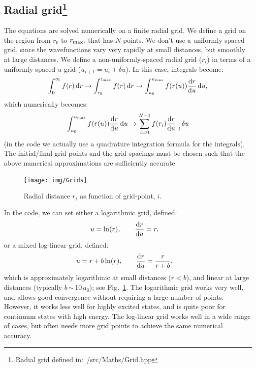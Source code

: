 \documentclass[10pt,twocolumn,a4paper]{article}%
\newcommand{\be}{\begin{equation}}
\newcommand{\ee}{\end{equation}}
\def\d{\ensuremath{{\rm d}}}
\begin{document}
\subsection[Radial grid]{Radial grid\label{sec:grid}\footnote{Radial grid defined in:~/src/Maths/Grid.hpp}}

The equations are solved numerically on a finite radial grid.
We define a grid on the region from $r_0$ to $r_{\rm max}$, that has $N$ points.
We don't use a uniformly spaced grid, since the wavefunctions vary very rapidly at small distances, but smoothly at large distances.
We define a non-uniformly-spaced radial grid ($r_i$) in terms of a uniformly spaced $u$ grid ($u_{i+1}=u_i+\delta u$).
In this case, integrals become:
\be
\int_{0}^{\infty} f(r)\,\d r \to 
\int_{r_0}^{\rm r_{max}} f(r)\,\d r \to 
\int_{u_0}^{u_{\rm max}} f(r(u))\frac{\d r}{\d u}\,\d u,
\ee
which numerically becomes:
\be
\int_{u_0}^{u_{\rm max}} f(r(u))\frac{\d r}{\d u}\,\d u \to
\sum_{i=0}^{N-1} f(r_i)\frac{\d r}{\d u}\Big|_i\,\delta u
\ee
(in the code we actually use a quadrature integration formula for the integrals).
The initial/final grid points and the grid spacings must be chosen such that the above numerical approximations are sufficiently accurate.

\begin{figure}
\centering
\texttt{[image: img/Grids]}
\caption{\small Radial distance $r_i$ as function of grid-point, $i$.\label{Fig:grids}}
\end{figure}



In the code, we can set either a logarithmic grid, defined:
\begin{align}
u &= \ln(r), \qquad
\frac{\d r}{\d u} = r,
\end{align}
or a mixed log-linear grid, defined: 
\begin{align}
u &= r + b \ln(r), \qquad
\frac{\d r}{\d u} = \frac{r}{r + b},
\end{align}
which is approximately logarithmic at small distances ($r<b$), and linear at large distances (typically $b$\,$\sim$\,10\,$a_0$); see Fig.~\ref{Fig:grids}.
The logarithmic grid works very well, and allows good convergence without requiring a large number of points.
However, it works less well for highly excited states, and is quite poor for continuum states with high energy.
The log-linear grid works well in a wide range of cases, but often needs more grid points to achieve the same numerical accuracy.
\end{document}
